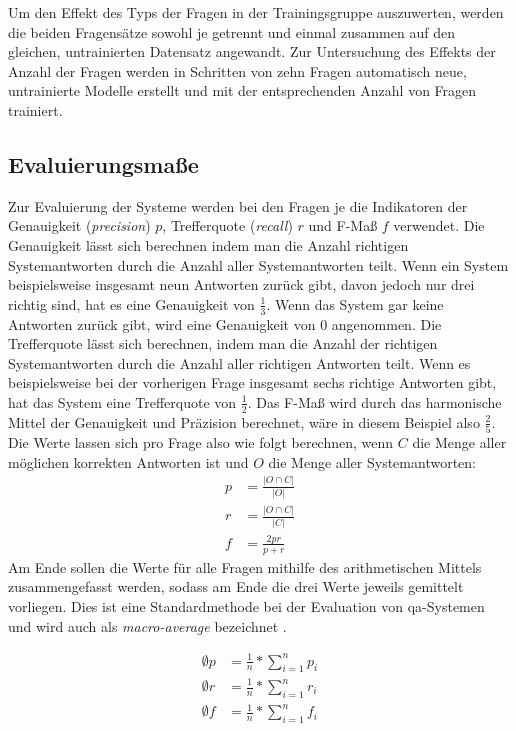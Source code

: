 Um den Effekt des Typs der Fragen in der Trainingsgruppe auszuwerten,
werden die beiden Fragensätze sowohl je getrennt und einmal zusammen auf den gleichen, untrainierten Datensatz angewandt.
Zur Untersuchung des Effekts der Anzahl der Fragen werden in Schritten von zehn Fragen automatisch neue,
untrainierte Modelle erstellt und mit der entsprechenden Anzahl von Fragen trainiert.

\subsection{Evaluierungsmaße}

Zur Evaluierung der Systeme werden bei den Fragen je die Indikatoren der Genauigkeit (\emph{precision}) $p$, Trefferquote (\emph{recall}) $r$ und F-Maß $f$ verwendet.
Die Genauigkeit lässt sich berechnen indem man die Anzahl richtigen Systemantworten durch die Anzahl aller Systemantworten teilt.
Wenn ein System beispielsweise insgesamt neun Antworten zurück gibt, davon jedoch nur drei richtig sind, hat es eine Genauigkeit von $\frac{1}{3}$.
Wenn das System gar keine Antworten zurück gibt, wird eine Genauigkeit von $0$ angenommen.
Die Trefferquote lässt sich berechnen, indem man die Anzahl der richtigen Systemantworten durch die Anzahl aller richtigen Antworten teilt.
Wenn es beispielsweise bei der vorherigen Frage insgesamt sechs richtige Antworten gibt, hat das System eine Trefferquote von $\frac{1}{2}$.
Das F-Maß wird durch das harmonische Mittel der Genauigkeit und Präzision berechnet, wäre in diesem Beispiel also $\frac{2}{5}$.
Die Werte lassen sich pro Frage also wie folgt berechnen, wenn $C$ die Menge aller möglichen korrekten Antworten ist und $O$ die Menge aller Systemantworten:
\begin{align*}
  p&=\frac{|O \cap C|}{|O|} \\
  r&=\frac{|O \cap C|}{|C|} \\
  f&=\frac{2pr}{p+r}
\end{align*}
Am Ende sollen die Werte für alle Fragen mithilfe des arithmetischen Mittels zusammengefasst werden, sodass am Ende die drei Werte jeweils gemittelt vorliegen.
Dies ist eine Standardmethode bei der Evaluation von \ac{qa}-Systemen und wird auch als \emph{macro-average} bezeichnet \citep{qald9}.

\begin{align*}
  \emptyset p&=\frac{1}{n}*\sum_{i=1}^{n}p_i \\
  \emptyset r&=\frac{1}{n}*\sum_{i=1}^{n}r_i \\
  \emptyset f&=\frac{1}{n}*\sum_{i=1}^{n}f_i
\end{align*}

